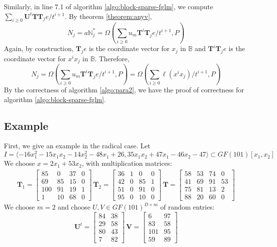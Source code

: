 \documentclass[12pt]{article}
\def\N {\ensuremath{\mathbb{N}}}
\def\mT{\mathbf{T}}
\def\mU{\mathbf{U}}
\def\mV{\mathbf{V}}
\begin{document}
Similarly, in line 7.1 of algorithm \ref{algo:block-sparse-fglm}, we compute
$\sum_{i\ge0} \mU^t \mT \mT_j e / t^{i+1}$. By theorem \ref{theorem:anyv},
$$N_j = a \N^*_j = \Omega(\sum_{i\ge 0} u_m \mT^i \mT_j e/t^{i+1},P) $$
Again, by construction, $\mT_j e$ is the coordinate vector for $x_j$ in 
$\mathbb{B}$ and $\mT^i \mT_j e$ is the coordinate vector for $x^i x_j$ in
$\mathbb{B}$. Therefore,
$$ N_j =  \Omega(\sum_{i\ge 0} u_m \mT^i \mT_j e/t^{i+1},P) =
 \Omega(\sum_{i\ge 0} \ell(x^ix_j)/t^{i+1},P)$$
By the correctness of algorithm \ref{algo:para2}, we have the proof
of correctness for algorithm \ref{algo:block-sparse-fglm}.

\newpage
\subsection{Example}
First, we give an example in the radical case. Let
$$I = \langle -16x_1^2 - 15x_1x_2 - 14x_2^2 - 48x_1 + 26, 35x_1x_2 + 47x_1 - 46x_2 - 47 \rangle \subset GF(101)[x_1,x_2]$$
We choose $x = 2x_1 + 53 x_2$, with multiplication matrices:
\begin{align*}
\mT_1 = \begin{bmatrix}
 85&   0&  37&   0\\
 69&  85&  15&   0\\
100&  91&  19&   1\\
  1&  10&  68&   0
\end{bmatrix}\,
\mT_2 = \begin{bmatrix}
36&  1&  0&  0\\
42&  0& 85&  1\\
51&  0& 91&  0\\
95&  0& 10&  0
\end{bmatrix}\,
\mT = \begin{bmatrix}
58& 53& 74&  0\\
41& 69& 91& 53\\
75& 81& 13&  2\\
88& 20& 60&  0
\end{bmatrix}
\end{align*}
We choose $m = 2$ and choose $U,V \in GF(101)^{D\times m}$ of random
entries:
$$ \mU^t = \begin{bmatrix}
84& 38\\
29& 58\\
80& 43\\
 7& 82
\end{bmatrix}\,
\mV = \begin{bmatrix}
  6&  97\\
 83&  58\\
101&  95\\
 59&  89
\end{bmatrix}
$$
\end{document}
